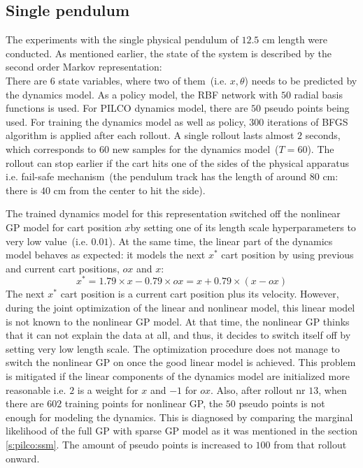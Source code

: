 \subsection{Single pendulum}
\label{s:exps:single}
The experiments with the single physical pendulum of $12.5$ cm length were conducted. As mentioned earlier, the state of the system is described by the second order Markov representation:
\begin{equation}
[oou, ox, o \theta, ou, x, \theta, u] \nonumber
\end{equation}
There are $6$ state variables, where two of them\ (i.e. $x, \theta$) needs to be predicted by the dynamics model. As a policy model, the RBF network with $50$ radial basis functions is used. For PILCO dynamics model, there are $50$ pseudo points being used. For training the dynamics model as well as policy, $300$ iterations of BFGS algorithm is applied after each rollout. A single rollout lasts almost $2$ seconds, which corresponds to $60$ new samples for the dynamics model\ ($T=60$). The rollout can stop earlier if the cart hits one of the sides of the physical apparatus i.e. fail-safe mechanism\ (the pendulum track has the length of around $80$ cm: there is $40$ cm from the center to hit the side).

\noindent The trained dynamics model for this representation switched off the nonlinear GP model for cart position $x$by setting one of its length scale hyperparameters to very low value\ (i.e. $0.01$). At the same time, the linear part of the dynamics model behaves as expected: it models the next $x^{*}$ cart position by using previous and current cart positions, $ox$ and $x$:
\begin{equation}
x^{*} = 1.79 \times x - 0.79 \times ox = x + 0.79 \times (x-ox) \nonumber
\end{equation}
The next $x^{*}$ cart position is a current cart position plus its velocity. However, during the joint optimization of the linear and nonlinear model, this linear model is not known to the nonlinear GP model. At that time, the nonlinear GP thinks that it can not explain the data at all, and thus, it decides to switch itself off by setting very low length scale. The optimization procedure does not manage to switch the nonlinear GP on once the good linear model is achieved. This problem is mitigated if the linear components of the dynamics model are initialized more reasonable i.e. $2$ is a weight for $x$ and $-1$ for $ox$. Also, after rollout nr $13$, when there are $602$ training points for nonlinear GP, the $50$ pseudo points is not enough for modeling the dynamics. This is diagnosed by comparing the marginal likelihood of the full GP with sparse GP model as it was mentioned in the section \ref{s:pilco:ssm}. The amount of pseudo points is increased to $100$ from that rollout onward.

